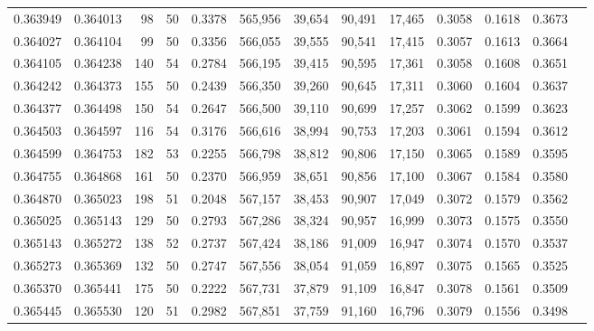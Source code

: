 \begin{tabular}{rrrrrrrrrrrrr}
0.363949 & 0.364013 &    98 &  50 &                                     0.3378 & 565,956 &  39,654 &  90,491 &  17,465 & 0.3058 & 0.1618 & 0.3673 \\
0.364027 & 0.364104 &    99 &  50 &                                     0.3356 & 566,055 &  39,555 &  90,541 &  17,415 & 0.3057 & 0.1613 & 0.3664 \\
0.364105 & 0.364238 &   140 &  54 &                                     0.2784 & 566,195 &  39,415 &  90,595 &  17,361 & 0.3058 & 0.1608 & 0.3651 \\
0.364242 & 0.364373 &   155 &  50 &                                     0.2439 & 566,350 &  39,260 &  90,645 &  17,311 & 0.3060 & 0.1604 & 0.3637 \\
0.364377 & 0.364498 &   150 &  54 &                                     0.2647 & 566,500 &  39,110 &  90,699 &  17,257 & 0.3062 & 0.1599 & 0.3623 \\
0.364503 & 0.364597 &   116 &  54 &                                     0.3176 & 566,616 &  38,994 &  90,753 &  17,203 & 0.3061 & 0.1594 & 0.3612 \\
0.364599 & 0.364753 &   182 &  53 &                                     0.2255 & 566,798 &  38,812 &  90,806 &  17,150 & 0.3065 & 0.1589 & 0.3595 \\
0.364755 & 0.364868 &   161 &  50 &                                     0.2370 & 566,959 &  38,651 &  90,856 &  17,100 & 0.3067 & 0.1584 & 0.3580 \\
0.364870 & 0.365023 &   198 &  51 &                                     0.2048 & 567,157 &  38,453 &  90,907 &  17,049 & 0.3072 & 0.1579 & 0.3562 \\
0.365025 & 0.365143 &   129 &  50 &                                     0.2793 & 567,286 &  38,324 &  90,957 &  16,999 & 0.3073 & 0.1575 & 0.3550 \\
0.365143 & 0.365272 &   138 &  52 &                                     0.2737 & 567,424 &  38,186 &  91,009 &  16,947 & 0.3074 & 0.1570 & 0.3537 \\
0.365273 & 0.365369 &   132 &  50 &                                     0.2747 & 567,556 &  38,054 &  91,059 &  16,897 & 0.3075 & 0.1565 & 0.3525 \\
0.365370 & 0.365441 &   175 &  50 &                                     0.2222 & 567,731 &  37,879 &  91,109 &  16,847 & 0.3078 & 0.1561 & 0.3509 \\
0.365445 & 0.365530 &   120 &  51 &                                     0.2982 & 567,851 &  37,759 &  91,160 &  16,796 & 0.3079 & 0.1556 & 0.3498 \\

\end{tabular}
